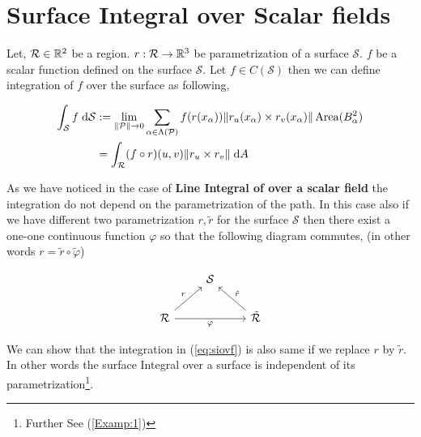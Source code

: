 \documentclass[../Analysis-3.tex]{subfiles}
\begin{document}
\section{Surface Integral over Scalar fields}

Let, $\mathcal{R} \in \mathbb{R}^2$ be a region. $r:\mathcal{R} \to \mathbb{R}^3$ be parametrization of a surface $\mathcal{S}$. $f$ be a scalar function defined on the surface $\mathcal{S}$. Let $f \in C(\mathcal{S})$ then we can define integration of $f$ over the surface as following,

\begin{align}
  \int_{\mathcal{S}} f \hspace{0.1cm} \dd \mathcal{S} & := \lim_{\norm{\mathcal{P}} \to 0} \sum_{\alpha \in \Lambda (\mathcal{P})} f(r(x_{\alpha})) \norm{r_u(x_{\alpha}) \times r_v(x_{\alpha})} \operatorname{Area}(B_{\alpha}^2) \nonumber \\
                                                      & = \int_{\mathcal{R}} (f \circ r)(u,v) \norm{r_u \times r_v} \hspace{0.1cm} \dd A \label{eq:siovf}
\end{align}

As we have noticed in the case of \textbf{Line Integral of over a scalar field} the integration do not depend on the parametrization of the path. In this case also if we have different two parametrization $r, \tilde{r}$ for the surface $\mathcal{S}$ then there exist a one-one continuous function $\varphi$ so that the following diagram commutes, (in other words $r = \tilde{r} \circ \tilde{\varphi}$)

\[\begin{tikzcd}
    & {\mathcal{S}} \\
    {\mathcal{R}} && {\tilde{\mathcal{R}}}
    \arrow["r", from=2-1, to=1-2]
    \arrow["{\tilde{r}}"', from=2-3, to=1-2]
    \arrow["\varphi"', from=2-1, to=2-3]
  \end{tikzcd}\]

We can show that the integration in (\ref{eq:siovf}) is also same if we replace $r$ by $\tilde{r}$. In other words the surface Integral over a surface is independent of its parametrization\footnote{Further See (\ref{Examp:1})}.
\end{document}
